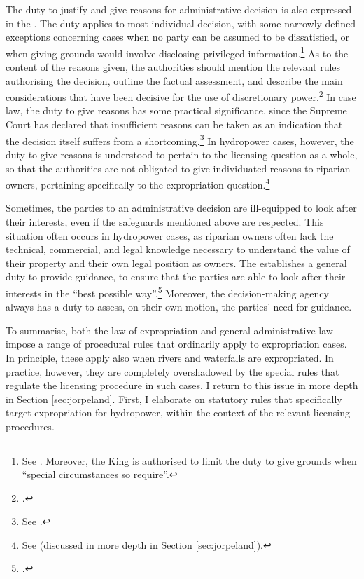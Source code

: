 {The duty to justify and give reasons for administrative decision is also expressed in the \cite{paa67}. The duty applies to most individual decision, with some narrowly defined exceptions concerning cases when no party can be assumed to be dissatisfied, or when giving grounds would involve disclosing privileged information.\footnote{See \cite[24]{paa67}. Moreover, the King is authorised to limit the duty to give grounds when ``special circumstances so require''.} As to the content of the reasons given, the authorities should mention the relevant rules authorising the decision, outline the factual assessment, and describe the main considerations that have been decisive for the use of discretionary power.\footcite[25]{paa67} In case law, the duty to give reasons has some practical significance, since the Supreme Court has declared that insufficient reasons can be taken as an indication that the decision itself suffers from a shortcoming.\footnote{See \cite{isene81,hauge00}.} In hydropower cases, however, the duty to give reasons is understood to pertain to the licensing question as a whole, so that the authorities are not obligated to give individuated reasons to riparian owners, pertaining specifically to the expropriation question.\footnote{See \cite{sauda09,jorpeland11} (discussed in more depth in Section \ref{sec:jorpeland}).}

Sometimes, the parties to an administrative decision are ill-equipped to look after their interests, even if the safeguards mentioned above are respected. This situation often occurs in hydropower cases, as riparian owners often lack the technical, commercial, and legal knowledge necessary to understand the value of their property and their own legal position as owners. The \cite{paa67} establishes a general duty to provide guidance, to ensure that the parties are able to look after their interests in the ``best possible way''.\footcite[11]{paa67} Moreover, the decision-making agency always has a duty to assess, on their own motion, the parties' need for guidance.

To summarise, both the law of expropriation and general administrative law impose a range of procedural rules that ordinarily apply to expropriation cases. In principle, these apply also when rivers and waterfalls are expropriated. In practice, however, they are completely overshadowed by the special rules that regulate the licensing procedure in such cases. I return to this issue in more depth in Section \ref{sec:jorpeland}. First, I elaborate on statutory rules that specifically target expropriation for hydropower, within the context of the relevant licensing procedures.
}
